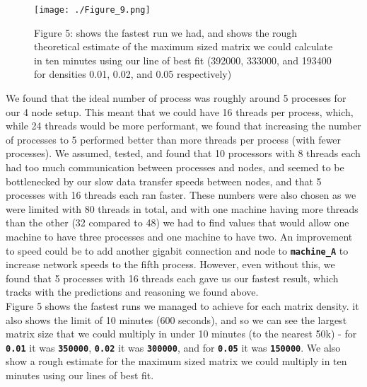 \documentclass[11pt,leqno]{article}
\begin{document}
\begin{flushleft}
\begin{figure}[h!]
  \centering
\texttt{[image: ./Figure\_9.png]}
\caption{Figure 5: shows the fastest run we had, and shows the rough
theoretical estimate of the maximum sized matrix we could calculate in ten
minutes using our line of best fit (392000, 333000, and 193400 for densities 0.01, 0.02, and 0.05 respectively)}
\end{figure}

\pagebreak
We found that the ideal number of process was roughly around 5 processes
for our 4 node setup. This meant that we could have 16 threads per
process, which, while 24 threads would be more performant, we found that
increasing the number of processes to 5 performed better than more
threads per process (with fewer processes). We assumed, tested, and found
that 10 processors with 8 threads each had too much communication
between processes and nodes, and seemed to be bottlenecked by our slow data transfer speeds between nodes, and that 5 processes with 16 threads each ran faster.
These numbers were also chosen as we were limited with 80 threads in
total, and with one machine having more threads than the other (32
compared to 48) we had to find values that would allow one machine to
have three processes and one machine to have two. An improvement to
speed could be to add another gigabit connection and node to
\textbf{\texttt{machine_A}} to increase network speeds to the
fifth process. However, even without this, we found that 5 processes
with 16 threads each gave us our fastest result, which tracks with the
predictions and reasoning we found above. \\[2 ex]

Figure 5 shows the fastest runs we managed to achieve for each matrix
density. it also shows the limit of 10 minutes (600 seconds), and so we
can see the largest matrix size that we could multiply in under 10
minutes (to the nearest 50k) - for \textbf{\texttt{0.01}} it was
\textbf{\texttt{350000}}, \textbf{\texttt{0.02}} it was
\textbf{\texttt{300000}}, and for \textbf{\texttt{0.05}}
it was \textbf{\texttt{150000}}. We also show a rough estimate
for the maximum sized matrix we could multiply in ten minutes using our
lines of best fit.


\end{flushleft}
\end{document}
